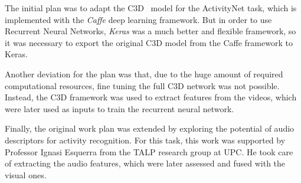 The initial plan was to adapt the C3D~\cite{tran2014learning} model for the ActivityNet task, which is implemented with the \textit{Caffe} deep learning framework. But in order to use Recurrent Neural Networks, \textit{Keras} was a much better and flexible framework, so it was necessary to export the original C3D model from the Caffe framework to Keras.

Another deviation for the plan was that, due to the huge amount of required computational resources, fine tuning the full C3D network was not possible. Instead, the C3D framework was used to extract features from the videos, which were later used as inputs to train the recurrent neural network.

Finally, the original work plan was extended by exploring the potential of audio descriptors for activity recognition. For this task, this work was supported by Professor Ignasi Esquerra from the TALP research group at UPC. He took care of extracting the audio features, which were later assessed and fused with the visual ones.
